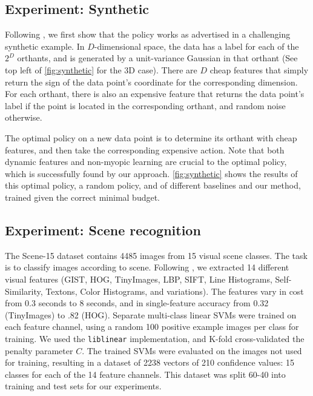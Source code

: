 \subsection{Experiment: Synthetic}



Following \cite{Xu-ICML-2013}, we first show that the policy works as advertised in a challenging synthetic example.
In $D$-dimensional space, the data has a label for each of the $2^D$ orthants, and is generated by a unit-variance Gaussian in that orthant (See top left of \autoref{fig:synthetic} for the 3D case).
There are $D$ cheap features that simply return the sign of the data point's coordinate for the corresponding dimension.
For each orthant, there is also an expensive feature that returns the data point's label if the point is located in the corresponding orthant, and random noise otherwise.

The optimal policy on a new data point is to determine its orthant with cheap features, and then take the corresponding expensive action.
Note that both dynamic features and non-myopic learning are crucial to the optimal policy, which is successfully found by our approach.
\autoref{fig:synthetic} shows the results of this optimal policy, a random policy, and of different baselines and our method, trained given the correct minimal budget.

\subsection{Experiment: Scene recognition}



The Scene-15 dataset \parencite{Lazebnik-CVPR-2006} contains 4485 images from 15 visual scene classes.
The task is to classify images according to scene.
Following \parencite{Xiao-CVPR-2010}, we extracted 14 different visual features (GIST, HOG, TinyImages, LBP, SIFT, Line Histograms, Self-Similarity, Textons, Color Histograms, and variations).
The features vary in cost from 0.3 seconds to 8 seconds, and in single-feature accuracy from 0.32 (TinyImages) to .82 (HOG).
Separate multi-class linear SVMs were trained on each feature channel, using a random 100 positive example images per class for training.
We used the \texttt{liblinear} implementation, and K-fold cross-validated the penalty parameter $C$.
The trained SVMs were evaluated on the images not used for training, resulting in a dataset of 2238 vectors of 210 confidence values: 15 classes for each of the 14 feature channels.
This dataset was split 60-40 into training and test sets for our experiments.


